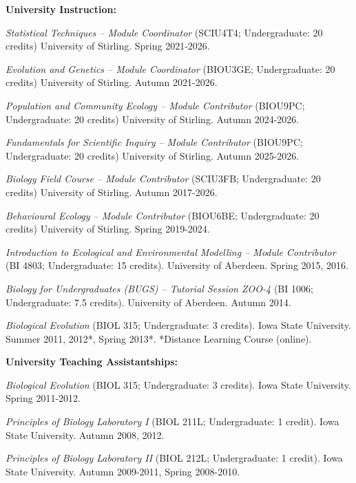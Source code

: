 \documentclass[letterpaper]{article}
\renewenvironment{itemize}{
  \begin{list}{}{
    \setlength{\leftmargin}{1.5em}
  }
}{
  \end{list}
}
\begin{document}
\begin{itemize}
\item {\bf University Instruction:}
\begin{itemize}
\item[$\bullet$]{{\it Statistical Techniques -- Module Coordinator} (SCIU4T4; Undergraduate: 20 credits) University of Stirling. Spring 2021-2026.}
\item[$\bullet$]{{\it Evolution and Genetics -- Module Coordinator} (BIOU3GE; Undergraduate: 20 credits) University of Stirling. Autumn 2021-2026.}
\item[$\bullet$]{{\it Population and Community Ecology -- Module Contributor} (BIOU9PC; Undergraduate: 20 credits) University of Stirling. Autumn 2024-2026.}
\item[$\bullet$]{{\it Fundamentals for Scientific Inquiry -- Module Contributor} (BIOU9PC; Undergraduate: 20 credits) University of Stirling. Autumn 2025-2026.}
\item[$\bullet$]{{\it Biology Field Course -- Module Contributor} (SCIU3FB; Undergraduate: 20 credits) University of Stirling. Autumn 2017-2026.}
\item[$\bullet$]{{\it Behavioural Ecology -- Module Contributor} (BIOU6BE; Undergraduate: 20 credits) University of Stirling. Spring 2019-2024.}
\item[$\bullet$]{{\it Introduction to Ecological and Environmental Modelling -- Module Contributor} (BI 4803; Undergraduate: 15 credits). University of Aberdeen. Spring 2015, 2016.}
\item[$\bullet$]{{\it Biology for Undergraduates (BUGS) -- Tutorial Session ZOO-4} (BI 1006; Undergraduate: 7.5 credits). University of Aberdeen. Autumn 2014.}
\item[$\bullet$]{{\it Biological Evolution} (BIOL 315; Undergraduate: 3 credits). Iowa State University. Summer 2011, 2012*, Spring 2013*. *Distance Learning Course (online).}
\end{itemize}

\item {\bf University Teaching Assistantships:}
\begin{itemize}
\item[$\bullet$]{{\it Biological Evolution} (BIOL 315; Undergraduate: 3 credits). Iowa State University. Spring 2011-2012.}
\item[$\bullet$]{{\it Principles of Biology Laboratory I} (BIOL 211L; Undergraduate: 1 credit). Iowa State University. Autumn 2008, 2012.}
\item[$\bullet$]{{\it Principles of Biology Laboratory II} (BIOL 212L; Undergraduate: 1 credit). Iowa State University. Autumn 2009-2011, Spring 2008-2010.}
\end{itemize}


\end{itemize}
\end{document}
